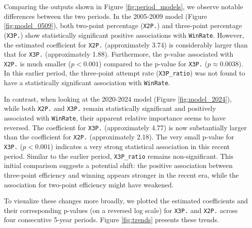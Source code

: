 \documentclass[11pt, a4paper]{article} %
\begin{document}
Comparing the outputs shown in Figure \ref{fig:period_models}, we observe notable differences between the two periods. 
In the 2005-2009 model (Figure \ref{fig:model_0509}), both two-point percentage (\texttt{X2P.}) and three-point percentage 
(\texttt{X3P.}) show statistically significant positive associations with \texttt{WinRate}. However, the estimated coefficient 
for \texttt{X2P.} (approximately 3.74) is considerably larger than that for \texttt{X3P.} (approximately 1.88). Furthermore, 
the p-value associated with \texttt{X2P.} is much smaller ($p < 0.001$) compared to the p-value for \texttt{X3P.} 
($p \approx 0.0038$). In this earlier period, the three-point attempt rate (\texttt{X3P\_ratio}) was not found to have 
a statistically significant association with \texttt{WinRate}.

In contrast, when looking at the 2020-2024 model (Figure \ref{fig:model_2024}), while both \texttt{X2P.} and \texttt{X3P.} 
remain statistically significant and positively associated with \texttt{WinRate}, their apparent relative importance seems to 
have reversed. The coefficient for \texttt{X3P.} (approximately 4.77) is now substantially larger than the coefficient 
for \texttt{X2P.} (approximately 2.18). The very small p-value for \texttt{X3P.} ($p < 0.001$) indicates a very strong 
statistical association in this recent period. Similar to the earlier period, \texttt{X3P\_ratio} remains non-significant. 
This initial comparison suggests a potential shift: the positive association between three-point efficiency and winning appears 
stronger in the recent era, while the association for two-point efficiency might have weakened.

To visualize these changes more broadly, we plotted the estimated coefficients and their corresponding p-values (on a reversed 
log scale) for \texttt{X3P.} and \texttt{X2P.} across four consecutive 5-year periods. Figure \ref{fig:trends} presents these trends.
\end{document}
